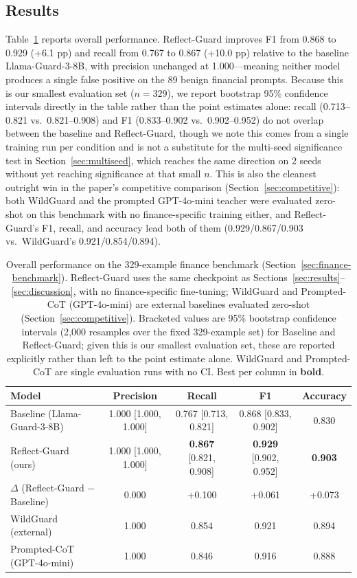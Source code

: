 \documentclass[Superintelligence,article,submit,pdftex,moreauthors]{Definitions/mdpi}
\begin{document}
\subsection{Results}

Table~\ref{tab:fin-overall} reports overall performance. Reflect-Guard improves F1 from 0.868 to 0.929 (+6.1 pp) and recall from 0.767 to 0.867 (+10.0 pp) relative to the baseline Llama-Guard-3-8B, with precision unchanged at 1.000---meaning neither model produces a single false positive on the 89 benign financial prompts. Because this is our smallest evaluation set ($n=329$), we report bootstrap 95\% confidence intervals directly in the table rather than the point estimates alone: recall (0.713--0.821 vs.\ 0.821--0.908) and F1 (0.833--0.902 vs.\ 0.902--0.952) do not overlap between the baseline and Reflect-Guard, though we note this comes from a single training run per condition and is not a substitute for the multi-seed significance test in Section~\ref{sec:multiseed}, which reaches the same direction on 2 seeds without yet reaching significance at that small $n$. This is also the cleanest outright win in the paper's competitive comparison (Section~\ref{sec:competitive}): both WildGuard and the prompted GPT-4o-mini teacher were evaluated zero-shot on this benchmark with no finance-specific training either, and Reflect-Guard's F1, recall, and accuracy lead both of them (0.929/0.867/0.903 vs.\ WildGuard's 0.921/0.854/0.894).

\begin{table}[H]
\caption{Overall performance on the 329-example finance benchmark (Section~\ref{sec:finance-benchmark}). Reflect-Guard uses the same checkpoint as Sections~\ref{sec:results}--\ref{sec:discussion}, with no finance-specific fine-tuning; WildGuard and Prompted-CoT (GPT-4o-mini) are external baselines evaluated zero-shot (Section~\ref{sec:competitive}). Bracketed values are 95\% bootstrap confidence intervals (2{,}000 resamples over the fixed 329-example set) for Baseline and Reflect-Guard; given this is our smallest evaluation set, these are reported explicitly rather than left to the point estimate alone. WildGuard and Prompted-CoT are single evaluation runs with no CI. Best per column in \textbf{bold}.}
\label{tab:fin-overall}
\centering
\small
\begin{tabular}{lcccc}
\toprule
\textbf{Model} & \textbf{Precision} & \textbf{Recall} & \textbf{F1} & \textbf{Accuracy} \\
\midrule
Baseline (Llama-Guard-3-8B) & 1.000 [1.000, 1.000] & 0.767 [0.713, 0.821] & 0.868 [0.833, 0.902] & 0.830 \\
Reflect-Guard (ours)        & 1.000 [1.000, 1.000] & \textbf{0.867} [0.821, 0.908] & \textbf{0.929} [0.902, 0.952] & \textbf{0.903} \\
\midrule
$\Delta$ (Reflect-Guard $-$ Baseline) & 0.000 & +0.100 & +0.061 & +0.073 \\
\midrule
WildGuard (external)        & 1.000 & 0.854 & 0.921 & 0.894 \\
Prompted-CoT (GPT-4o-mini)  & 1.000 & 0.846 & 0.916 & 0.888 \\
\bottomrule
\end{tabular}
\end{table}
\end{document}
